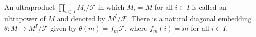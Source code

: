 An ultraproduct $\prod_{i \in I} M_i / \mathcal{F}$ in which $M_i = M$ for all $i \in I$ is called an ultrapower of $M$ and denoted by $M^I / \mathcal{F}$. There is a natural diagonal embedding $\theta: M \to M^I / \mathcal{F}$ given by $\theta(m) = f_m\mathcal{F}$, where $f_m(i) = m$ for all $i \in I$.
